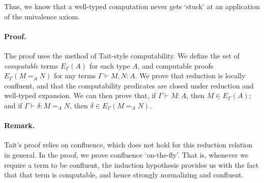 \documentclass{easychair}
\begin{document}
Thus, we know that a well-typed computation never gets `stuck' at an application of the univalence axiom.

\paragraph{Proof.} The proof uses the method of Tait-style computability.
We define the set of \emph{computable} terms $E_\Gamma(A)$ for each type $A$,
and computable proofs $E_\Gamma(M =_A N)$ for any terms $\Gamma \vdash M,N : A$. We prove that reduction is locally confluent, and that the computability predicates are closed under reduction and well-typed expansion.  We can then prove that, if $\Gamma \vdash M : A$, then $M \in E_\Gamma(A)$; and if $\Gamma \vdash \delta : M =_A N$, then $\delta \in E_\Gamma(M =_A N)$. 

\paragraph{Remark.} Tait's proof relies on confluence, which does not hold for this reduction relation in general.  In the proof, we prove confluence `on-the-fly'.  That is, whenever we require a term to be confluent, the induction hypothesis provides us with the fact that that term is computable, and hence strongly normalizing and confluent.


%
\end{document}
